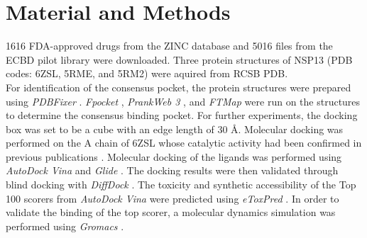 \documentclass[11pt, letterpaper, titlepage]{article}
\renewcommand{\cite}{\parencite}
\begin{document}
\section{Material and Methods}
1616 FDA-approved drugs from the ZINC database \cite{Irwin.2020} and 5016 files from the ECBD pilot library were downloaded.
Three protein structures of NSP13 (PDB codes: 6ZSL, 5RME, and 5RM2) were aquired from RCSB PDB. \\
\noindent For identification of the consensus pocket, the protein structures were prepared using \textit{PDBFixer} \cite{Eastman_2017}. \textit{Fpocket} \cite{package_Fpocket}, \textit{PrankWeb 3} \cite{package_P2Rank,package_PrankWeb,package_PrankWeb3}, and \textit{FTMap} \cite{package_FTMAP} were run on the structures to determine the consensus binding pocket. For further experiments, the docking box was set to be a cube with an edge length of 30 \AA. Molecular docking was performed on the A chain of 6ZSL whose catalytic activity had been confirmed in previous publications \cite{Berta_2021}. Molecular docking of the ligands was performed using \textit{AutoDock Vina} \cite{Trott.2010} and \textit{Glide} \cite{Friesner2004}. The docking results were then validated through blind docking with \textit{DiffDock} \cite{Corso.2022}. The toxicity and synthetic accessibility of the Top 100 scorers from \textit{AutoDock Vina} were predicted using \textit{eToxPred} \cite{pu2019toxpred}.
In order to validate the binding of the top scorer, a molecular dynamics simulation was performed using \textit{Gromacs} \cite{packageGROMACS}.\\
\end{document}

